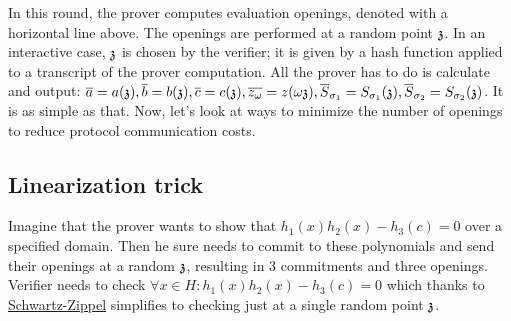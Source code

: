     

In this round, the prover computes evaluation openings, denoted with a horizontal line above. The openings are performed at a random point $\mathfrak{z}$. In an interactive case, $\mathfrak{z}$ is chosen by the verifier; it is given by a hash function applied to a transcript of the prover computation. All the prover has to do is calculate and output: $\overline{a} = a(\mathfrak{z}), \overline{b} = b(\mathfrak{z}), \overline{c} = c(\mathfrak{z}), \overline{z_\omega} = z(\omega\mathfrak{z}),\overline{S}_{\sigma_1} = S_{\sigma_1}(\mathfrak{z}), \overline{S}_{\sigma_2} = S_{\sigma_2}(\mathfrak{z})$. It is as simple as that. Now, let's look at ways to minimize the number of openings to reduce protocol communication costs.

\subsection{Linearization trick}
Imagine that the prover wants to show that $h_1(x)h_2(x) - h_3(c) = 0$ over a specified domain. Then he sure needs to commit to these polynomials and send their openings at a random $\mathfrak{z}$, resulting in 3 commitments and three openings. Verifier needs to check $\forall x \in H: h_1(x)h_2(x) - h_3(c) = 0$ which thanks to \href{https://en.wikipedia.org/wiki/Schwartz%E2%80%93Zippel_lemma}{Schwartz-Zippel} simplifies to checking just at a single random point $\mathfrak{z}$. 



